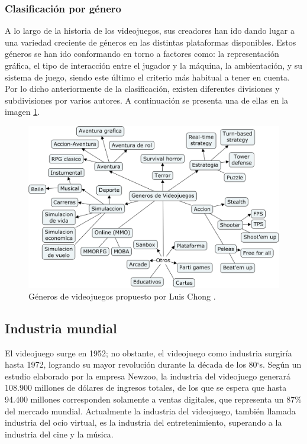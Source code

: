 	\subsubsection{Clasificación por género}
	A lo largo de la historia de los videojuegos, sus creadores han ido dando lugar a una variedad creciente de géneros en las distintas plataformas disponibles. Estos géneros se han ido conformando en torno a factores como: la representación gráfica, el tipo de interacción entre el jugador y la máquina, la ambientación, y su sistema de juego, siendo este último el criterio más habitual a tener en cuenta. Por lo dicho anteriormente de la clasificación, existen diferentes divisiones y subdivisiones por varios autores. A continuación se presenta una de ellas en la imagen \ref{fig:vidGen}.
	\\[1pt]
	
	\begin{figure}
		\centering
		\includegraphics[width=\textwidth]{03MarcoTeorico/imageR/gene.png}
		\caption{Géneros de videojuegos propuesto por Luis Chong \cite{vid12}.}
		\label{fig:vidGen}
	\end{figure}
	
	
		
\subsection{Industria mundial}
			 
			 El videojuego surge en 1952; no obstante, el videojuego como industria surgiría hasta 1972, logrando su mayor revolución durante la década de los 80`s. 
			 Según un estudio elaborado por la empresa Newzoo, la industria del videojuego generará 108.900 millones de dólares de ingresos totales, de los que se espera que hasta 94.400 millones corresponden solamente a ventas digitales, que representa un 87\% del mercado mundial. Actualmente la industria del videojuego, también llamada industria del ocio virtual, es la industria del entretenimiento, superando a la industria del cine y la música.
			 \\[1pt]	
			 

